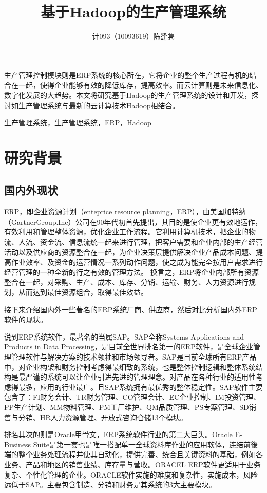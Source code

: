 \documentclass{Proposal}
\begin{document}
\title{基于Hadoop的生产管理系统}
\author{计093（10093619）陈逢隽}
\date{}
\maketitle
\thispagestyle{fancy}

\ECUSTabstract 生产管理控制模块则是ERP系统的核心所在，它将企业的整个生产过程有机的结合在一起，使得企业能够有效的降低库存，提高效率。而云计算则是未来信息化、数字化发展的大趋势。本文将研究基于Hadoop的生产管理系统的设计和开发，探讨如生产管理系统与最新的云计算技术Hadoop相结合。

\ECUSTkeywords 生产管理系统，生产管理系统，ERP，Hadoop

\section{研究背景}

\subsection{国内外现状}

ERP，即企业资源计划（enteprice resource planning，ERP），由美国加特纳（GartnerGroup.Inc）公司在90年代初首先提出，其目的是使企业更有效地运作，有效利用和管理整体资源，优化企业工作流程。它利用计算机技术，把企业的物流、人流、资金流、信息流统一起来进行管理，把客户需要和企业内部的生产经营活动以及供应商的资源整合在一起，为企业决策层提供解决企业产品成本问题、提高作业效率、及资金的运营情况一系列动作问题，使之成为能完全按用户需求进行经营管理的一种全新的行之有效的管理方法。 换言之，ERP将企业内部所有资源整合在一起，对采购、生产、成本、库存、分销、运输、财务、人力资源进行规划，从而达到最佳资源组合，取得最佳效益。

接下来介绍国内外一些著名的ERP系统厂商、供应商，然后对比分析国内外ERP软件的现状。

说到ERP系统软件，最著名的当属SAP。SAP全称Systems Applications and Products in Data Processing，是目前全世界排名第一的ERP软件，是全球企业管理管理软件与解决方案的技术领袖和市场领导者。SAP是目前全球所有ERP产品中，对企业构架和财务控制考虑得最细致的系统，也是整体控制逻辑和整体系统结构是最严谨的系统可以让企业引进先进的管理理念。对产品在各种行业的适用性考虑得最多，应用的行业最广。且SAP系统拥有最优秀的整体稳定性。SAP软件主要包含了：FI财务会计、TR财务管理、CO管理会计、EC企业控制、IM投资管理、PP生产计划、MM物料管理、PM工厂维护、QM品质管理、PS专案管理、SD销售与分销、HR人力资源管理、开放式咨询仓储13个模块。

排名其次的则是Oracle甲骨文，ERP系统软件行业的第二大巨头。Oracle E-Business Suite是第一套也是唯一搭配单一全球资料库作业的应用软体，连结前後端的整个业务处理流程并使其自动化，提供完善、统合且关键资料的基础，例如各业务、产品和地区的销售业绩、库存量与营收。ORACEL ERP软件更适用于业务复杂、个性化管理的企业。ORACLE软件实施的难度和复杂性，实施成本，风险远低于SAP。主要包含制造、分销和财务是其系统的3大主要模块。
\end{document}
